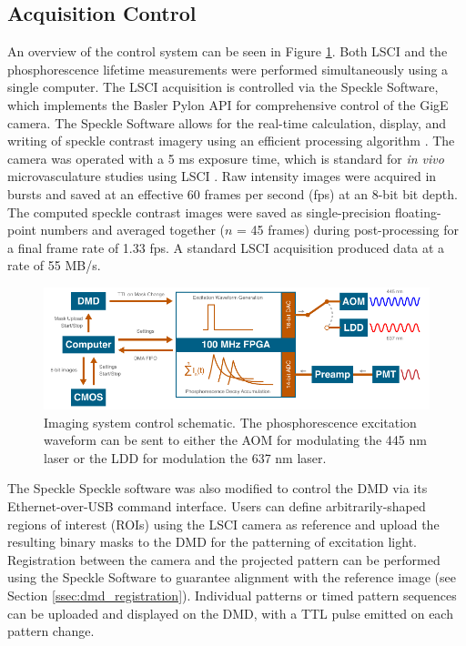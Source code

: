 \subsection{Acquisition Control} \label{ssec:acquisition_control}

An overview of the control system can be seen in Figure \ref{fig:controlschematic}. Both LSCI and the phosphorescence lifetime measurements were performed simultaneously using a single computer. The LSCI acquisition is controlled via the Speckle Software, which implements the Basler Pylon API for comprehensive control of the GigE camera. The Speckle Software allows for the real-time calculation, display, and writing of speckle contrast imagery using an efficient processing algorithm \cite{Tom:2008tg}. The camera was operated with a 5 ms exposure time, which is standard for \textit{in vivo} microvasculature studies using LSCI \cite{Yuan:2005tj}. Raw intensity images were acquired in bursts and saved at an effective 60 frames per second (fps) at an 8-bit bit depth. The computed speckle contrast images were saved as single-precision floating-point numbers and averaged together ($n$ = 45 frames) during post-processing for a final frame rate of 1.33 fps. A standard LSCI acquisition produced data at a rate of 55 MB/s.

\begin{figure}
    \includegraphics{figures/chapter_2/controlschematic.pdf}
    \caption {
        \label{fig:controlschematic}
        Imaging system control schematic. The phosphorescence excitation waveform can be sent to either the AOM for modulating the 445 nm laser or the LDD for modulation the 637 nm laser.
    }
\end{figure}

The Speckle Speckle software was also modified to control the DMD via its Ethernet-over-USB command interface. Users can define arbitrarily-shaped regions of interest (ROIs) using the LSCI camera as reference and upload the resulting binary masks to the DMD for the patterning of excitation light. Registration between the camera and the projected pattern can be performed using the Speckle Software to guarantee alignment with the reference image (see Section \ref{ssec:dmd_registration}). Individual patterns or timed pattern sequences can be uploaded and displayed on the DMD, with a TTL pulse emitted on each pattern change.

